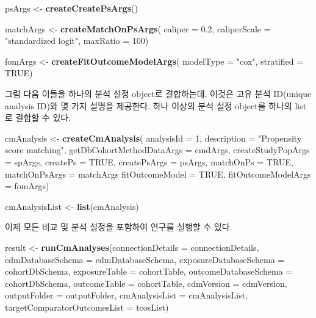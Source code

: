 \documentclass[11pt]{book}
\newenvironment{Shaded}{\begin{snugshade}}{\end{snugshade}}
\newcommand{\KeywordTok}[1]{\textcolor[rgb]{0.13,0.29,0.53}{\textbf{#1}}}
\newcommand{\DataTypeTok}[1]{\textcolor[rgb]{0.13,0.29,0.53}{#1}}
\newcommand{\DecValTok}[1]{\textcolor[rgb]{0.00,0.00,0.81}{#1}}
\newcommand{\FloatTok}[1]{\textcolor[rgb]{0.00,0.00,0.81}{#1}}
\newcommand{\StringTok}[1]{\textcolor[rgb]{0.31,0.60,0.02}{#1}}
\newcommand{\OtherTok}[1]{\textcolor[rgb]{0.56,0.35,0.01}{#1}}
\newcommand{\NormalTok}[1]{#1}
\theoremstyle{definition}
\theoremstyle{definition}
\theoremstyle{definition}
\theoremstyle{remark}
\begin{document}
\begin{Shaded}
\begin{Highlighting}[]
\NormalTok{psArgs <-}\StringTok{ }\KeywordTok{createCreatePsArgs}\NormalTok{()}

\NormalTok{matchArgs <-}\StringTok{ }\KeywordTok{createMatchOnPsArgs}\NormalTok{(}
  \DataTypeTok{caliper =} \FloatTok{0.2}\NormalTok{,}
  \DataTypeTok{caliperScale =} \StringTok{"standardized logit"}\NormalTok{,}
  \DataTypeTok{maxRatio =} \DecValTok{100}\NormalTok{)}

\NormalTok{fomArgs <-}\StringTok{ }\KeywordTok{createFitOutcomeModelArgs}\NormalTok{(}
  \DataTypeTok{modelType =} \StringTok{"cox"}\NormalTok{,}
  \DataTypeTok{stratified =} \OtherTok{TRUE}\NormalTok{)}
\end{Highlighting}
\end{Shaded}

그럼 다음 이들을 하나의 분석 설정 object로 결합하는데, 이것은 고유 분석
ID(unique analysis ID)와 몇 가지 설명을 제공한다. 하나 이상의 분석 설정
object를 하나의 list로 결합할 수 있다.

\begin{Shaded}
\begin{Highlighting}[]
\NormalTok{cmAnalysis <-}\StringTok{ }\KeywordTok{createCmAnalysis}\NormalTok{(}
  \DataTypeTok{analysisId =} \DecValTok{1}\NormalTok{,}
  \DataTypeTok{description =} \StringTok{"Propensity score matching"}\NormalTok{,}
  \DataTypeTok{getDbCohortMethodDataArgs =}\NormalTok{ cmdArgs,}
  \DataTypeTok{createStudyPopArgs =}\NormalTok{ spArgs,}
  \DataTypeTok{createPs =} \OtherTok{TRUE}\NormalTok{,}
  \DataTypeTok{createPsArgs =}\NormalTok{ psArgs,}
  \DataTypeTok{matchOnPs =} \OtherTok{TRUE}\NormalTok{,}
  \DataTypeTok{matchOnPsArgs =}\NormalTok{ matchArgs}
  \DataTypeTok{fitOutcomeModel =} \OtherTok{TRUE}\NormalTok{,}
  \DataTypeTok{fitOutcomeModelArgs =}\NormalTok{ fomArgs)}

\NormalTok{cmAnalysisList <-}\StringTok{ }\KeywordTok{list}\NormalTok{(cmAnalysis)}
\end{Highlighting}
\end{Shaded}

이제 모든 비교 및 분석 설정을 포함하여 연구를 실행할 수 있다.

\begin{Shaded}
\begin{Highlighting}[]
\NormalTok{result <-}\StringTok{ }\KeywordTok{runCmAnalyses}\NormalTok{(}\DataTypeTok{connectionDetails =}\NormalTok{ connectionDetails,}
                        \DataTypeTok{cdmDatabaseSchema =}\NormalTok{ cdmDatabaseSchema,}
                        \DataTypeTok{exposureDatabaseSchema =}\NormalTok{ cohortDbSchema,}
                        \DataTypeTok{exposureTable =}\NormalTok{ cohortTable,}
                        \DataTypeTok{outcomeDatabaseSchema =}\NormalTok{ cohortDbSchema,}
                        \DataTypeTok{outcomeTable =}\NormalTok{ cohortTable,}
                        \DataTypeTok{cdmVersion =}\NormalTok{ cdmVersion,}
                        \DataTypeTok{outputFolder =}\NormalTok{ outputFolder,}
                        \DataTypeTok{cmAnalysisList =}\NormalTok{ cmAnalysisList,}
                        \DataTypeTok{targetComparatorOutcomesList =}\NormalTok{ tcosList)}
\end{Highlighting}
\end{Shaded}
\end{document}
